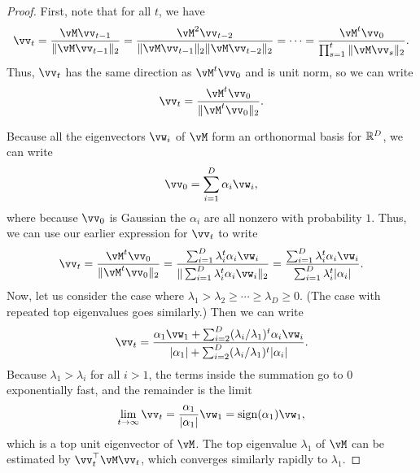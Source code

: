 \documentclass[../../book-main.tex]{subfiles}
\begin{document}
\begin{proof} First, note that for all \(t\), we have 
\begin{equation}
    \vv_{t} = \frac{\vM\vv_{t - 1}}{\norm{\vM\vv_{t - 1}}_{2}} = \frac{\vM^{2}\vv_{t - 2}}{\norm{\vM\vv_{t - 1}}_{2}\norm{\vM\vv_{t - 2}}_{2}} = \cdots = \frac{\vM^{t}\vv_{0}}{\prod_{s = 1}^{t}\norm{\vM\vv_{s}}_{2}}.
\end{equation}
Thus, \(\vv_{t}\) has the same direction as \(\vM^{t}\vv_{0}\) and is unit norm, so we can write 
\begin{equation}
    \vv_{t} = \frac{\vM^{t}\vv_{0}}{\norm{\vM^{t}\vv_{0}}_{2}}.
\end{equation}

Because all the eigenvectors \(\vw_{i}\) of $\vM$ form an orthonormal basis for \(\mathbb{R}^{D}\), we can write 
\begin{equation}
    \vv_{0} = \sum_{i = 1}^{D}\alpha_{i}\vw_{i},
\end{equation}
where because \(\vv_{0}\) is Gaussian the \(\alpha_{i}\) are all nonzero with probability \(1\). Thus, we can use our earlier expression for \(\vv_{t}\) to write
\begin{equation}
    \vv_{t} = \frac{\vM^{t}\vv_{0}}{\norm{\vM^{t}\vv_{0}}_{2}} = \frac{\sum_{i = 1}^{D}\lambda_{i}^{t}\alpha_{i}\vw_{i}}{\norm{\sum_{i = 1}^{D}\lambda_{i}^{t}\alpha_{i}\vw_{i}}_{2}} = \frac{\sum_{i = 1}^{D}\lambda_{i}^{t}\alpha_{i}\vw_{i}}{\sum_{i = 1}^{D}\lambda_{i}^{t}\abs{\alpha_{i}}}. 
\end{equation}
Now, let us consider the case where \(\lambda_{1} > \lambda_{2} \geq \cdots \geq \lambda_{D} \geq 0\). (The case with repeated top eigenvalues goes similarly.) Then we can write
\begin{equation}
    \vv_{t} = \frac{\alpha_{1}\vw_{1} + \sum_{i = 2}^{D}(\lambda_{i}/\lambda_{1})^{t}\alpha_{i}\vw_{i}}{\abs{\alpha_{1}} + \sum_{i = 2}^{D}(\lambda_{i}/\lambda_{1})^{t}\abs{\alpha_{i}}}.
\end{equation}
Because \(\lambda_{1} > \lambda_{i}\) for all \(i > 1\), the terms inside the summation go to \(0\) exponentially fast, and the remainder is the limit 
\begin{equation}
    \lim_{t \to \infty}\vv_{t} = \frac{\alpha_{1}}{\abs{\alpha_{1}}}\vw_{1} = \sign(\alpha_{1})\vw_{1},
\end{equation}
which is a top unit eigenvector of \(\vM\). The top eigenvalue \(\lambda_{1}\) of \(\vM\) can be estimated by \(\vv_{t}^{\top}\vM\vv_{t}\), which converges similarly rapidly to \(\lambda_{1}\). 
\end{proof}
\end{document}

